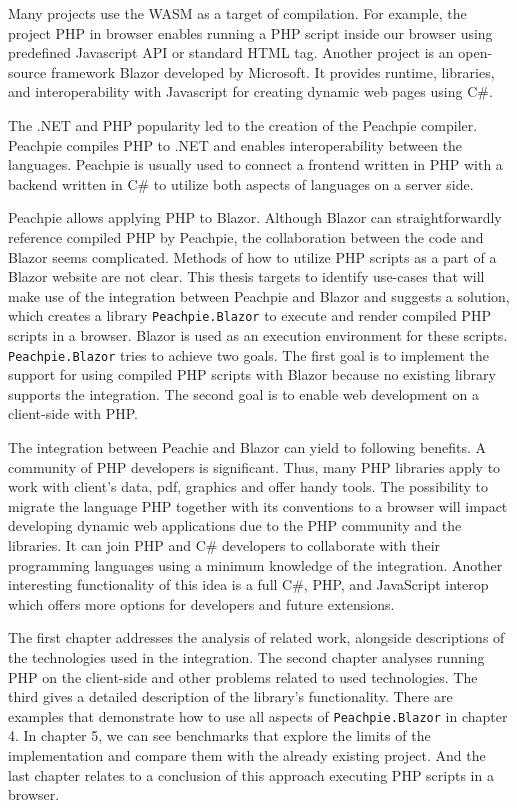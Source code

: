 \par
Many projects use the WASM as a target of compilation.
For example, the project PHP in browser \cite{online:pib} enables running a PHP script inside our browser using predefined Javascript API or standard HTML tag.
Another project is an open-source framework Blazor \cite{online:blazor} developed by Microsoft.
It provides runtime, libraries, and interoperability with Javascript for creating dynamic web pages using C\#.
\par
The .NET and PHP popularity led to the creation of the Peachpie compiler.
Peachpie \cite{online:peachpie} compiles PHP to .NET and enables interoperability between the languages.
Peachpie is usually used to connect a frontend written in PHP with a backend written in C\# to utilize both aspects of languages on a server side.
\par
Peachpie allows applying PHP to Blazor. 
Although Blazor can straightforwardly reference compiled PHP by Peachpie, the collaboration between the code and Blazor seems complicated.
Methods of how to utilize PHP scripts as a part of a Blazor website are not clear. 
This thesis targets to identify use-cases that will make use of the integration between Peachpie and Blazor and suggests a solution, which creates a library \texttt{Peachpie.Blazor} to execute and render compiled PHP scripts in a browser.
Blazor is used as an execution environment for these scripts.
\texttt{Peachpie.Blazor} tries to achieve two goals.
The first goal is to implement the support for using compiled PHP scripts with Blazor because no existing library supports the integration.
The second goal is to enable web development on a client-side with PHP.
\par
The integration between Peachie and Blazor can yield to following benefits.
A community of PHP developers is significant.
Thus, many PHP libraries apply to work with client's data, pdf, graphics and offer handy tools.
The possibility to migrate the language PHP together with its conventions to a browser will impact developing dynamic web applications due to the PHP community and the libraries.
It can join PHP and C\# developers to collaborate with their programming languages using a minimum knowledge of the integration.
Another interesting functionality of this idea is a full C\#, PHP, and JavaScript interop which offers more options for developers and future extensions.
\par
The first chapter addresses the analysis of related work, alongside descriptions of the technologies used in the integration.
The second chapter analyses running PHP on the client-side and other problems related to used technologies.
The third gives a detailed description of the library's functionality.
There are examples that demonstrate how to use all aspects of \texttt{Peachpie.Blazor} in chapter 4.
In chapter 5, we can see benchmarks that explore the limits of the implementation and compare them with the already existing project.
And the last chapter relates to a conclusion of this approach executing PHP scripts in a browser.
